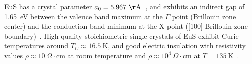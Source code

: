 EuS has a crystal parameter $a_0=5.967~\mathrm\AA$~\cite{EuS_Shafer}, and exhibits an indirect gap of 1.65~eV between the valence band maximum at the $\Gamma$ point (Brillouin zone center) and the conduction band minimum at the X point ([100] Brillouin zone boundary)~\cite{EuX_absorption, EuS_band_th1, EuS_band_th2}. High quality stoichiometric single crystals of EuS exhibit Curie temperatures around $T_C\approx16.5~\mathrm{K}$, and good electric insulation with resistivity values $\rho\approx10~\Omega\cdot\mathrm{cm}$ at room temperature and $\rho\approx10^4~\Omega\cdot\mathrm{cm}$ at $T=135~\mathrm{K}$~\cite{EuS_Shafer}. 